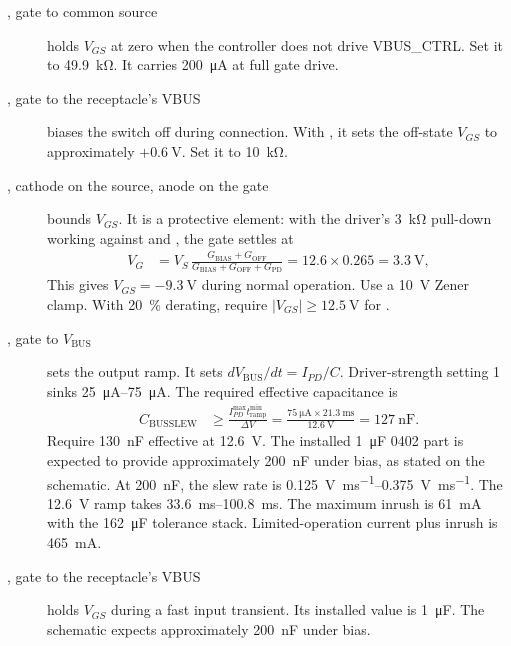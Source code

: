 \begin{description}
  \item[, gate to common source] holds $V_{GS}$ at zero when the
    controller does not drive VBUS\_CTRL. Set it to \SI{49.9}{\kilo\ohm}. It
    carries \SI{200}{\micro\ampere} at full gate drive.
  \item[, gate to the receptacle's VBUS] biases the switch off
    during connection. With , it sets the off-state $V_{GS}$ to
    approximately $+\SI{0.6}{\volt}$. Set it to \SI{10}{\kilo\ohm}.
  \item[, cathode on the source, anode on the gate] bounds
    $V_{GS}$. It is a protective element: with the driver's
    \SI{3}{\kilo\ohm} pull-down working against  and
    , the gate settles at
    \begin{align*}
      V_G &= V_S\,\frac{G_{\mathrm{BIAS}}+G_{\mathrm{OFF}}}
                       {G_{\mathrm{BIAS}}+G_{\mathrm{OFF}}+G_{\mathrm{PD}}}
        = 12.6 \times 0.265 = \SI{3.3}{\volt},
    \end{align*}
    This gives $V_{GS}=-\SI{9.3}{\volt}$ during normal operation. Use a
    \SI{10}{\volt} Zener clamp. With \SI{20}{\percent} derating, require
    $|V_{GS}|\geq\SI{12.5}{\volt}$ for .
  \item[, gate to $V_{\mathrm{BUS}}$] sets the output ramp. It
    sets $dV_{\mathrm{BUS}}/dt=I_{PD}/C$. Driver-strength setting 1 sinks
    \SIrange{25}{75}{\micro\ampere}. The required effective capacitance is
    \begin{align*}
      C_{\mathrm{BUSSLEW}} &\geq
        \frac{I_{PD}^{\max}t_{\mathrm{ramp}}^{\min}}{\Delta V}
        = \frac{\SI{75}{\micro\ampere}\times\SI{21.3}{\milli\second}}
               {\SI{12.6}{\volt}}
        = \SI{127}{\nano\farad}.
    \end{align*}
    Require \SI{130}{\nano\farad} effective at \SI{12.6}{\volt}. The
    installed \SI{1}{\micro\farad} 0402 part is expected to provide
    approximately \SI{200}{\nano\farad} under bias, as stated on the schematic.
    At \SI{200}{\nano\farad}, the slew rate is
    \SIrange{0.125}{0.375}{\volt\per\milli\second}. The \SI{12.6}{\volt} ramp
    takes \SIrange{33.6}{100.8}{\milli\second}. The maximum inrush is
    \SI{61}{\milli\ampere} with the \SI{162}{\micro\farad} tolerance stack.
    Limited-operation current plus inrush is \SI{465}{\milli\ampere}.
  \item[, gate to the receptacle's VBUS] holds $V_{GS}$ during a
    fast input transient. Its installed value is \SI{1}{\micro\farad}. The
    schematic expects approximately \SI{200}{\nano\farad} under bias.
\end{description}

